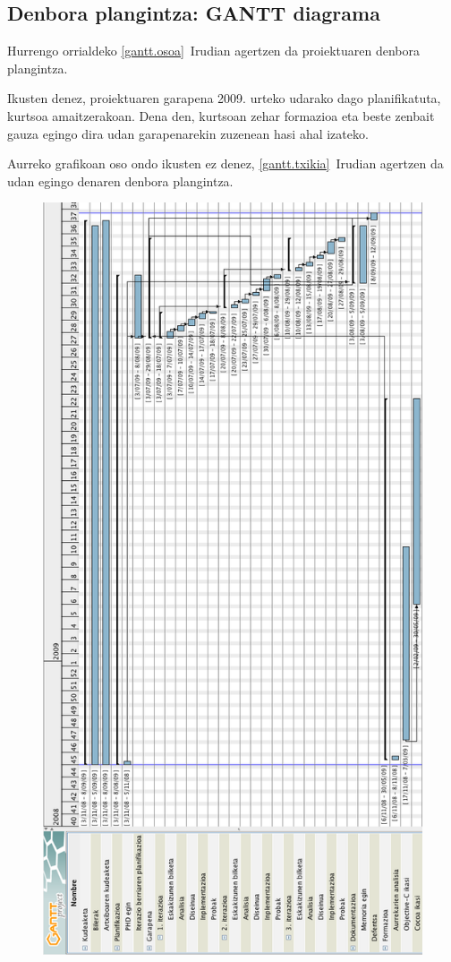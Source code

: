\subsection{Denbora plangintza: GANTT diagrama}
Hurrengo orrialdeko \ref{gantt.osoa}~Irudian agertzen da proiektuaren denbora plangintza.

Ikusten denez, proiektuaren garapena 2009. urteko udarako dago planifikatuta, kurtsoa amaitzerakoan. Dena den, kurtsoan zehar formazioa eta beste zenbait gauza egingo dira udan garapenarekin zuzenean hasi ahal izateko.

Aurreko grafikoan oso ondo ikusten ez denez, \ref{gantt.txikia}~Irudian agertzen da udan egingo denaren denbora plangintza.

\begin{figure}[htp]
\begin{center}
\includegraphics[scale=0.4]{Pictures/Chapter3/Gantt-osoa.png}

\end{center}
\end{figure}
